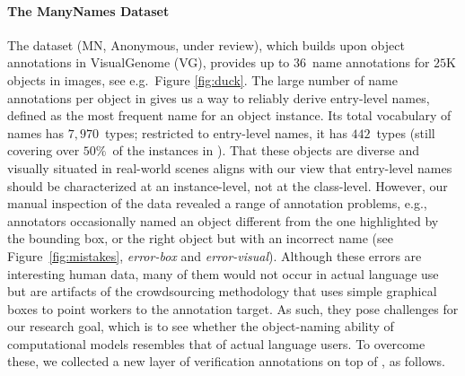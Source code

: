 \paragraph{The ManyNames Dataset}
The \mn dataset (MN, Anonymous, under review), which builds upon object annotations in VisualGenome (VG), provides up to $36$~name annotations for $25$K objects in images, see e.g.\ Figure \ref{fig:duck}.
The large number of name annotations per object in \mnshort gives us a way to reliably derive entry-level names, defined as the most frequent name for an object instance.
Its total vocabulary of names has $7,970$~types; restricted to entry-level names, it has $442$~types (still covering over $50\%$~of the  instances in \vgshort).
That these objects are diverse and visually situated in real-world scenes aligns with our view that entry-level names should be characterized at an instance-level, not at the class-level.
However, our manual inspection of the \mn data revealed a range of annotation problems, e.g., annotators occasionally named an object different from the one highlighted by the bounding box, or the right object but with an incorrect name (see Figure~\ref{fig:mistakes}, {\it error-box} and {\it error-visual}).
Although these errors are interesting human data, many of them would not occur in actual language use but are artifacts of the crowdsourcing methodology that uses simple graphical boxes to point workers to the annotation target.
As such, they pose challenges for our research goal, which is to see whether the object-naming ability of computational models resembles that of actual language users.
To overcome these, we collected a new layer of verification annotations on top of \mn, as follows.


